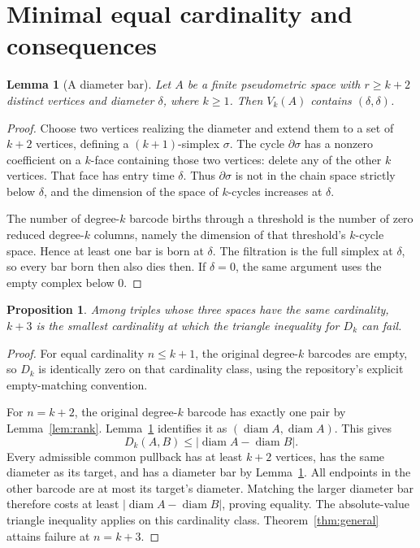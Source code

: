 \documentclass[11pt]{article}
\newtheorem{lemma}[theorem]{Lemma}
\newtheorem{proposition}[theorem]{Proposition}
\theoremstyle{remark}
\newcommand{\diam}{\operatorname{diam}}
\begin{document}
\section{Minimal equal cardinality and consequences}
\begin{lemma}[A diameter bar]\label{lem:diameter}
Let $A$ be a finite pseudometric space with $r\ge k+2$ distinct vertices
and diameter $\delta$, where $k\ge1$. Then $V_k(A)$ contains
$(\delta,\delta)$.
\end{lemma}
\begin{proof}
Choose two vertices realizing the diameter and extend them to a set of
$k+2$ vertices, defining a $(k+1)$-simplex $\sigma$.
The cycle $\partial\sigma$ has a nonzero coefficient on a $k$-face
containing those two vertices: delete any of the other $k$ vertices.
That face has entry time $\delta$. Thus $\partial\sigma$ is not in the
chain space strictly below $\delta$, and the dimension of the space of
$k$-cycles increases at $\delta$.

The number of degree-$k$ barcode births through a threshold is the
number of zero reduced degree-$k$ columns, namely the dimension of
that threshold's $k$-cycle space. Hence at least one bar is born at
$\delta$. The filtration is the full simplex at $\delta$, so every
bar born then also dies then. If $\delta=0$, the same argument uses
the empty complex below $0$.
\end{proof}

\begin{proposition}\label{prop:minimal}
Among triples whose three spaces have the same cardinality, $k+3$ is the
smallest cardinality at which the triangle inequality for $D_k$ can fail.
\end{proposition}
\begin{proof}
For equal cardinality $n\le k+1$, the original degree-$k$ barcodes are
empty, so $D_k$ is identically zero on that cardinality class, using the
repository's explicit empty-matching convention.

For $n=k+2$, the original degree-$k$ barcode has exactly one pair by
Lemma~\ref{lem:rank}. Lemma~\ref{lem:diameter} identifies it as
$(\diam A,\diam A)$. This gives
\[
D_k(A,B)\le |\diam A-\diam B|.
\]
Every admissible common pullback has at least $k+2$ vertices, has the
same diameter as its target, and has a diameter bar by
Lemma~\ref{lem:diameter}. All endpoints in the other barcode are at most
its target's diameter. Matching the larger diameter bar therefore costs
at least $|\diam A-\diam B|$, proving equality. The absolute-value triangle
inequality applies on this cardinality class. Theorem~\ref{thm:general}
attains failure at $n=k+3$.
\end{proof}
\end{document}

